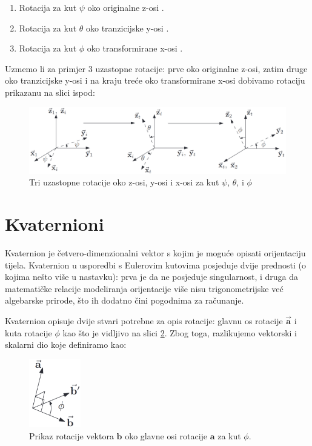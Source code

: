 \documentclass[times, utf8, diplomski, numeric]{templates/template}
\begin{document}
{{        \begin{enumerate}
            \item Rotacija za kut $\psi$ oko originalne z-osi .
            \item Rotacija za kut $\theta$ oko tranzicijske y-osi .
            \item Rotacija za kut $\phi$ oko transformirane x-osi .
        \end{enumerate}

        Uzmemo li za primjer 3 uzastopne rotacije: prve oko originalne z-osi, zatim druge oko tranzicijske y-osi i na kraju treće oko transformirane x-osi dobivamo rotaciju prikazanu na slici ispod: 

        \begin{figure}[htb]
        \centering
        \includegraphics[width=1.0\textwidth]{images/eulerovi_kutovi.jpg}
        \caption{Tri uzastopne rotacije oko z-osi, y-osi i x-osi za kut $\psi$, $\theta$, i $\phi$}
        \label{fig:euler_rotacija}
        \end{figure}
    }

    \section{Kvaternioni}{
        Kvaternion je četvero-dimenzionalni vektor s kojim je moguće opisati orijentaciju tijela. Kvaternion u usporedbi s Eulerovim kutovima posjeduje dvije prednosti (o kojima nešto više u nastavku): prva je da ne posjeduje singularnost, i druga da matematičke relacije modeliranja orijentacije više nisu trigonometrijske već algebarske prirode, što ih dodatno čini pogodnima za računanje.

        Kvaternion opisuje dvije stvari potrebne za opis rotacije: glavnu os rotacije  $\overrightarrow{\boldsymbol{a}}$ i kuta rotacije $\phi$ kao što je vidljivo na slici \ref{fig:principal_axis_rotation}. Zbog toga, razlikujemo vektorski i skalarni dio koje definiramo kao:

        \begin{figure}[htb]
        \centering
        \includegraphics[width=0.2\textwidth]{images/principal_axis_rotation.png}
        \caption{Prikaz rotacije vektora $\boldsymbol{b}$ oko glavne osi rotacije $\boldsymbol{a}$ za kut $\phi$.}
        \label{fig:principal_axis_rotation}
        \end{figure}

}}
\end{document}

